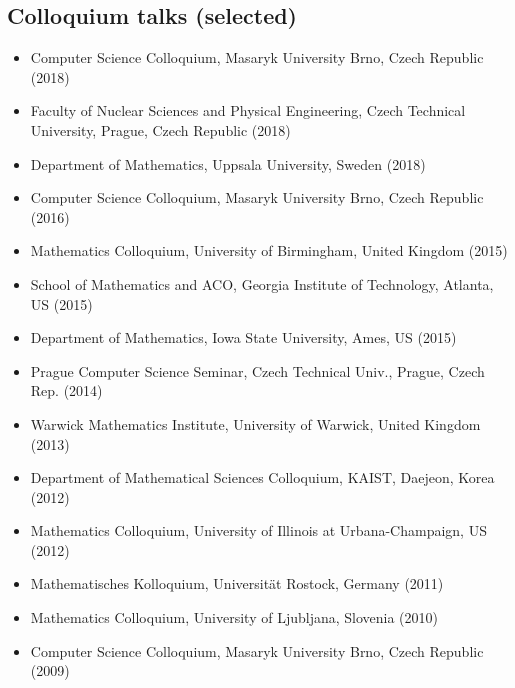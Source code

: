 \documentclass[11pt]{article}
\begin{document}
\subsection*{Colloquium talks (selected)}
\begin{itemize}
\setlength\itemsep{-1mm}
\item Computer Science Colloquium, Masaryk University Brno, Czech Republic (2018)
\item Faculty of Nuclear Sciences and Physical Engineering, Czech Technical University, Prague, Czech Republic (2018)
\item Department of Mathematics, Uppsala University, Sweden (2018)
\item Computer Science Colloquium, Masaryk University Brno, Czech Republic (2016)
\item Mathematics Colloquium, University of Birmingham, United Kingdom (2015)
\item School of Mathematics and ACO, Georgia Institute of Technology, Atlanta, US (2015)
\item Department of Mathematics, Iowa State University, Ames, US (2015)
\item Prague Computer Science Seminar, Czech Technical Univ., Prague, Czech Rep. (2014)
\item Warwick Mathematics Institute, University of Warwick, United Kingdom (2013)
\item Department of Mathematical Sciences Colloquium, KAIST, Daejeon, Korea (2012)
\item Mathematics Colloquium, University of Illinois at Urbana-Champaign, US (2012) 
\item Mathematisches Kolloquium, Universit\"at Rostock, Germany (2011)
\item Mathematics Colloquium, University of Ljubljana, Slovenia (2010)
\item Computer Science Colloquium, Masaryk University Brno, Czech Republic (2009)
\end{itemize}
\end{document}
